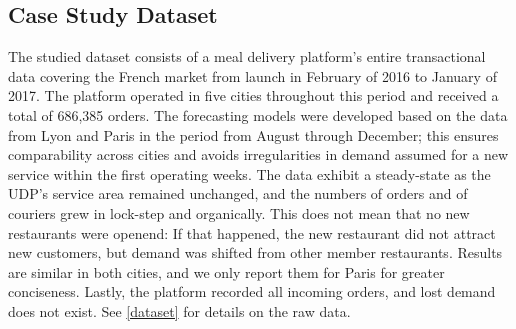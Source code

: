 \subsection{Case Study Dataset}
\label{data}

The studied dataset consists of a meal delivery platform's entire
    transactional data covering the French market from launch in February of
    2016 to January of 2017.
The platform operated in five cities throughout this period and received a
    total of 686,385 orders.
The forecasting models were developed based on the data from Lyon and Paris in
    the period from August through December; this ensures comparability across
    cities and avoids irregularities in demand assumed for a new service
    within the first operating weeks.
The data exhibit a steady-state as the UDP's service area remained
    unchanged, and the numbers of orders and of couriers grew in lock-step and
    organically.
This does not mean that no new restaurants were openend: If that happened, the
    new restaurant did not attract new customers, but demand was shifted from
    other member restaurants.
Results are similar in both cities, and we only report them for Paris for
    greater conciseness.
Lastly, the platform recorded all incoming orders, and lost demand does not
    exist.
See \ref{dataset} for details on the raw data.
